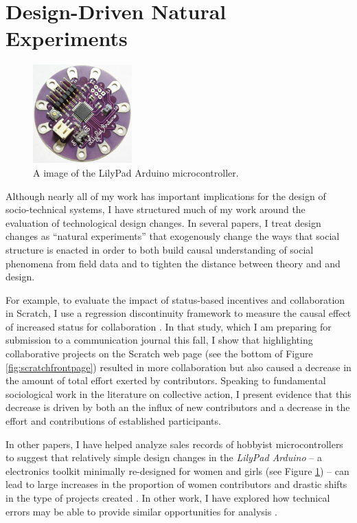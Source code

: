 \documentclass[10pt]{memoir}
\begin{document}
\section{Design-Driven Natural Experiments}

\begin{figure}
 \begin{centering}
 \includegraphics[width=1.5in]{figures/lilypad.png}
 \caption{A image of the LilyPad Arduino microcontroller.}
 \label{fig:lilypad}
 \end{centering}
\end{figure}

Although nearly all of my work has important implications for the
design of socio-technical systems, I have structured much of my work
around the evaluation of technological design changes. In several
papers, I treat design changes as ``natural experiments'' that
exogenously change the ways that social structure is enacted in order
to both build causal understanding of social phenomena from field data
and to tighten the distance between theory and and design.

For example, to evaluate the impact of status-based incentives and
collaboration in Scratch, I use a regression discontinuity framework
to measure the causal effect of increased status for collaboration
\cite{hill_causal_2012}. In that study, which I am preparing for
submission to a communication journal this fall, I show that
highlighting collaborative projects on the Scratch web page (see the
bottom of Figure \ref{fig:scratchfrontpage}) resulted in more
collaboration but also caused a decrease in the amount of total effort
exerted by contributors. Speaking to fundamental sociological work in
the literature on collective action, I present evidence that this
decrease is driven by both an the influx of new contributors and a
decrease in the effort and contributions of established participants.

In other papers, I have helped analyze sales records of hobbyist
microcontrollers to suggest that relatively simple design changes in
the \emph{LilyPad Arduino} -- a electronics toolkit minimally
re-designed for women and girls (see Figure \ref{fig:lilypad}) -- can
lead to large increases in the proportion of women contributors and
drastic shifts in the type of projects created
\cite{buechley_lilypad_2010}. In other work, I have explored how
technical errors may be able to provide similar opportunities for
analysis \cite{hill_revealing_2010}.
\end{document}
